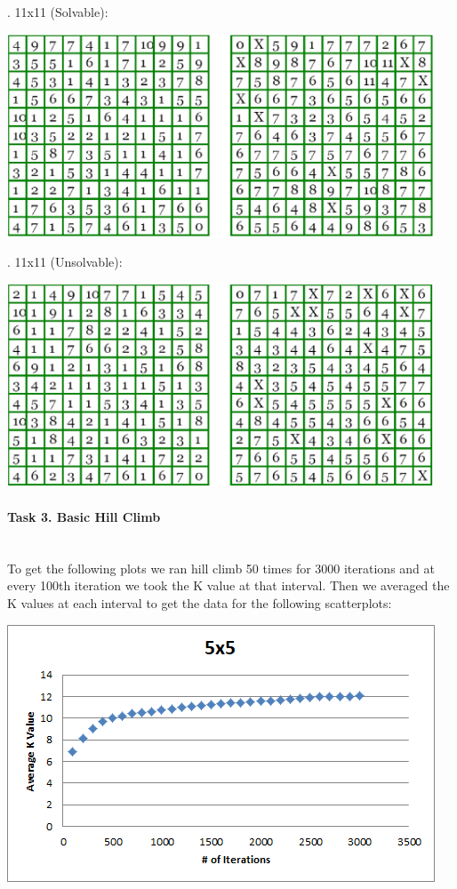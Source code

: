\documentclass[12pt, letterpaper]{article}
\begin{document}
\bigskip
{}. 11x11 (Solvable):
	
\includegraphics[width=5in, keepaspectratio]{"Task 2/11x11 Puzzle (Solvable)"}

\bigskip
{}. 11x11 (Unsolvable):

\includegraphics[width=5in, keepaspectratio]{"Task 2/11x11 Puzzle (Unsolvable)"}

\pagebreak
\paragraph{Task 3. Basic Hill Climb} \mbox{}\\

To get the following plots we ran hill climb 50 times for 3000 iterations and at every 100th iteration we took the K value at that interval. Then we averaged the K values at each interval to get the data for the following scatterplots:

\includegraphics[width=\linewidth]{"Task 3/5x5 Scatterplot"}
\end{document}
